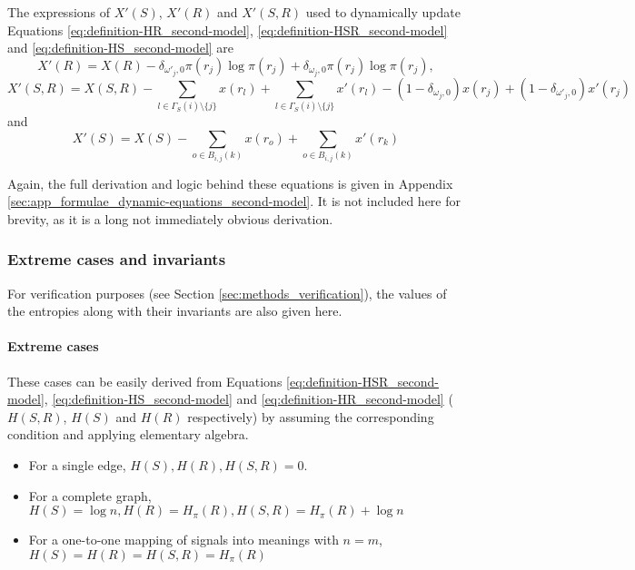 The expressions of $X'(S)$, $X'(R)$ and $X'(S,R)$ used to dynamically update Equations \eqref{eq:definition-HR_second-model}, \eqref{eq:definition-HSR_second-model} and \eqref{eq:definition-HS_second-model} are
\begin{equation}
  \label{eq:definition-XR_second-model_dynamic}
  X'(R) = X(R) - \delta_{\omega'_j,0} \pi(r_j) \log \pi(r_j) + \delta_{\omega_j,0} \pi(r_j) \log \pi(r_j),
\end{equation}
\begin{equation}
  \label{eq:definition-XSR_second-model_dynamic}
  X'(S,R) = X(S,R) - \sum_{l \in \Gamma_S(i) \setminus \{ j \}} x(r_l) + \sum_{l \in \Gamma_S(i) \setminus \{ j \}} x'(r_l) - (1 - \delta_{\omega_j,0}) x(r_j) + (1 - \delta_{\omega'_j,0}) x'(r_j)
\end{equation}
and
\begin{equation}
  \label{eq:definition-XS_second-model_dynamic}
  X'(S) = X(S) - \sum_{o \in B_{i,j}(k)} x(r_o) + \sum_{o \in B_{i,j}(k)} x'(r_k)
\end{equation}

Again, the full derivation and logic behind these equations is given in Appendix \ref{sec:app_formulae_dynamic-equations_second-model}.
It is not included here for brevity, as it is a long not immediately obvious derivation.

\subsubsection{Extreme cases and invariants}
\label{sec:model_math_first-model_invariants}

For verification purposes (see Section \ref{sec:methods_verification}), the values of the entropies along with their invariants are also given here.

\paragraph{Extreme cases} These cases can be easily derived from Equations \eqref{eq:definition-HSR_second-model}, \eqref{eq:definition-HS_second-model} and \eqref{eq:definition-HR_second-model} ($H(S,R)$, $H(S)$ and $H(R)$ respectively) by assuming the corresponding condition and applying elementary algebra.

\begin{itemize}
\item For a single edge, $H(S), H(R), H(S,R) = 0$.
\item For a complete graph, $H(S) = \log n, H(R) = H_\pi(R), H(S,R) = H_\pi(R) + \log n$
\item For a one-to-one mapping of signals into meanings with $n=m$,\\$H(S) = H(R) = H(S,R) = H_\pi(R)$
\end{itemize}

